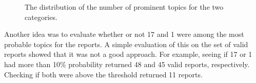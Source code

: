 \begin{figure}[h!]
    \centering
    \caption{The distribution of the number of prominent topics for the two categories.}
    \label{fig:prominent-topic-dist}
\end{figure}

Another idea was to evaluate whether or not 17 and 1 were among the most probable topics for the reports.
A simple evaluation of this on the set of valid reports showed that it was not a good approach.
For example, seeing if 17 or 1 had more than 10\% probability returned 48 and 45 valid reports, respectively.
Checking if both were above the threshold returned 11 reports.